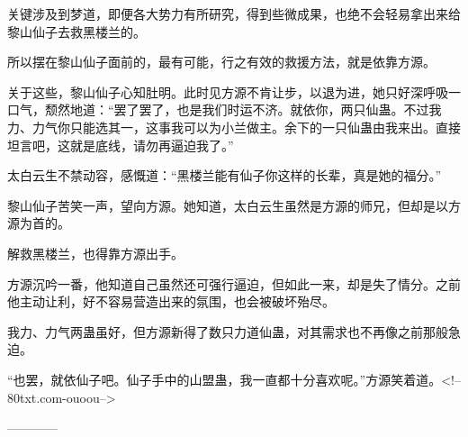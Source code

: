 \begin{this_body}
关键涉及到梦道，即便各大势力有所研究，得到些微成果，也绝不会轻易拿出来给黎山仙子去救黑楼兰的。

所以摆在黎山仙子面前的，最有可能，行之有效的救援方法，就是依靠方源。

关于这些，黎山仙子心知肚明。此时见方源不肯让步，以退为进，她只好深呼吸一口气，颓然地道：“罢了罢了，也是我们时运不济。就依你，两只仙蛊。不过我力、力气你只能选其一，这事我可以为小兰做主。余下的一只仙蛊由我来出。直接坦言吧，这就是底线，请勿再逼迫我了。”

太白云生不禁动容，感慨道：“黑楼兰能有仙子你这样的长辈，真是她的福分。”

黎山仙子苦笑一声，望向方源。她知道，太白云生虽然是方源的师兄，但却是以方源为首的。

解救黑楼兰，也得靠方源出手。

方源沉吟一番，他知道自己虽然还可强行逼迫，但如此一来，却是失了情分。之前他主动让利，好不容易营造出来的氛围，也会被破坏殆尽。

我力、力气两蛊虽好，但方源新得了数只力道仙蛊，对其需求也不再像之前那般急迫。

“也罢，就依仙子吧。仙子手中的山盟蛊，我一直都十分喜欢呢。”方源笑着道。<!--80txt.com-ouoou-->

------------

\end{this_body}

